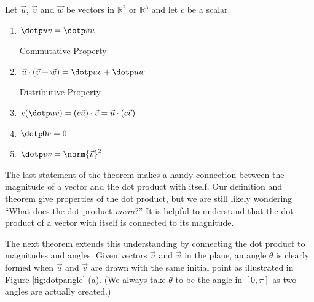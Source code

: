 {Let $\vec u$, $\vec v$ and $\vec w$ be vectors in $\mathbb{R}^2$ or $\mathbb{R}^3$ and let $c$ be a scalar.
\begin{enumerate}
	\item \parbox{150pt}{$\dotp uv = \dotp vu$}{Commutative Property}
	\item \parbox{150pt}{$\vec u\cdot(\vec v+\vec w) = \dotp uv + \dotp uw$}{Distributive Property}
	\item	$c(\dotp uv) = (c\vec u)\cdot \vec v = \vec u \cdot (c\vec v)$
	\item	$\dotp 0v = 0$
	\item	$\dotp vv=\norm{\vec v}^2 $
\end{enumerate}
}

The last statement of the theorem makes a handy connection between the magnitude of a vector and the dot product with itself. 
Our definition and theorem give properties of the dot product, but we are still likely wondering ``What does the dot product \emph{mean}?'' It is helpful to understand that the dot product of a vector with itself is connected to its magnitude.

The next theorem extends this understanding by connecting the dot product to magnitudes and angles. Given vectors $\vec u$ and $\vec v$ in the plane, an angle $\theta$ is clearly formed when $\vec u$ and $\vec v$ are drawn with the same initial point as illustrated in Figure \ref{fig:dotpangle} (a). (We always take $\theta$ to be the angle in $[0,\pi]$ as two angles are actually created.) 

